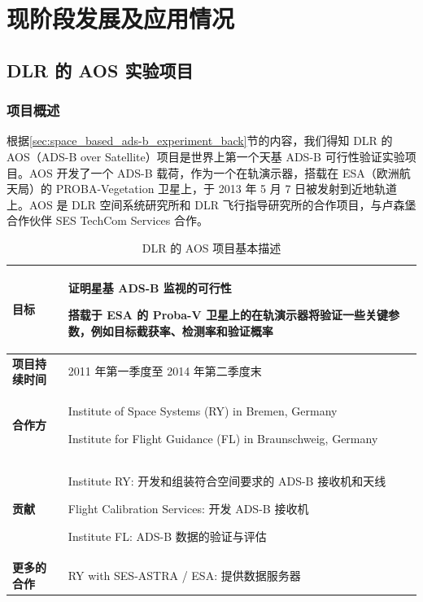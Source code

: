 
\chapter{现阶段发展及应用情况}

\section{DLR 的 AOS 实验项目}

\subsection{项目概述}

根据\ref{sec:space_based_ads-b_experiment_back}节的内容，我们得知 DLR 的 AOS（ADS-B over Satellite）项目是世界上第一个天基 ADS-B 可行性验证实验项目。AOS 开发了一个 ADS-B 载荷，作为一个在轨演示器，搭载在 ESA（欧洲航天局）的 PROBA-Vegetation 卫星上，于 2013 年 5 月 7 日被发射到近地轨道上。AOS 是 DLR 空间系统研究所和 DLR 飞行指导研究所的合作项目，与卢森堡合作伙伴 SES TechCom Services 合作。

\renewcommand\arraystretch{1.5}
\begin{table}[!htb]
\centering
\caption{DLR 的 AOS 项目基本描述}
\label{tab:}
\begin{tabular}[b]{|p{2.2cm}<{\raggedleft}|p{13cm}<{\raggedright}|}
\hline
\textbf{目标} & 证明星基 ADS-B 监视的可行性 \par
            搭载于 ESA 的 Proba-V 卫星上的在轨演示器将验证一些关键参数，例如目标截获率、检测率和验证概率 \\
\hline
\textbf{项目持续时间} & 2011 年第一季度至 2014 年第二季度末 \\
\hline
\textbf{合作方} & Institute of Space Systems (RY) in Bremen, Germany \par\par
        Institute for Flight Guidance (FL) in Braunschweig, Germany \\
\hline
\textbf{贡献} & Institute RY: 开发和组装符合空间要求的 ADS-B 接收机和天线\par
Flight Calibration Services: 开发 ADS-B 接收机\par
Institute FL: ADS-B 数据的验证与评估 \\
\hline
\textbf{更多的合作} & RY with SES-ASTRA / ESA: 提供数据服务器 \\
\hline
\end{tabular}
\end{table}

